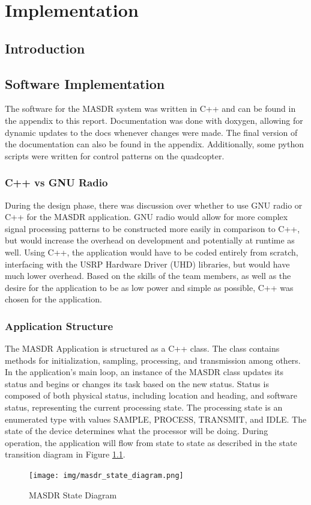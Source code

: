 \chapter{Implementation}

\section{Introduction}

\section{Software Implementation}
The software for the MASDR system was written in C++ and can be found in the appendix to this report. Documentation was done with doxygen, allowing for dynamic updates to the docs whenever changes were made. The final version of the documentation can also be found in the appendix. Additionally, some python scripts were written for control patterns on the quadcopter.
\subsection{C++ vs GNU Radio}
During the design phase, there was discussion over whether to use GNU radio or C++ for the MASDR application. GNU radio would allow for more complex signal processing patterns to be constructed more easily in comparison to C++, but would increase the overhead on development and potentially at runtime as well. Using C++, the application would have to be coded entirely from scratch, interfacing with the USRP Hardware Driver (UHD) libraries, but would have much lower overhead. Based on the skills of the team members, as well as the desire for the application to be as low power and simple as possible, C++ was chosen for the application.
\subsection{Application Structure}
The MASDR Application is structured as a C++ class. The class contains methods for initialization, sampling, processing, and transmission among others. In the application’s main loop, an instance of the MASDR class updates its status and begins or changes its task based on the new status. Status is composed of both physical status, including location and heading, and software status, representing the current processing state. The processing state is an enumerated type with values SAMPLE, PROCESS, TRANSMIT, and IDLE. The state of the device determines what the processor will be doing. During operation, the application will flow from state to state as described in the state transition diagram in Figure \ref{fig:state_diagram}.
\begin{figure}[ht]
\centering
\texttt{[image: img/masdr\_state\_diagram.png]}
\caption{MASDR State Diagram}
\label{fig:state_diagram}
\end{figure}
